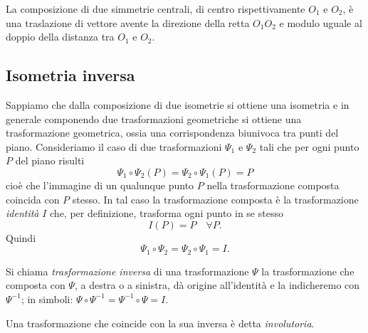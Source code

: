 \begin{proposizione}
La composizione di due simmetrie centrali, di centro rispettivamente 
$O_1$ e $O_2$, è una traslazione di vettore avente la direzione della 
retta $O_1O_2$ e modulo uguale al doppio della distanza tra $O_1$ e 
$O_2$.
\end{proposizione}
			
			
\subsection{Isometria inversa}
			
Sappiamo che dalla composizione di due isometrie si ottiene una 
isometria e in generale componendo due trasformazioni geometriche si 
ottiene una trasformazione geometrica, ossia una corrispondenza 
biunivoca tra punti del piano.
Consideriamo il caso di due trasformazioni $\Psi_1$ e $\Psi_2$ tali 
che per ogni punto $P$ del piano risulti
\[\Psi_1 \circ \Psi_2 (P) = \Psi_2 \circ \Psi_1 (P) = P\]
cioè che l'immagine di un qualunque punto $P$ nella trasformazione 
composta coincida con $P$ stesso. In tal caso la trasformazione 
composta è la trasformazione \emph{identità} $I$ che, per 
definizione, trasforma ogni punto in se stesso
\[I(P) = P\quad \forall P.\]
Quindi
\[\Psi_1 \circ \Psi_2 = \Psi_2 \circ \Psi_1 = I.\]

\begin{definizione}
Si chiama \emph{trasformazione inversa} di una trasformazione $\Psi$ 
la trasformazione che composta con $\Psi$, a destra o a sinistra, dà 
origine all'identità e la indicheremo con $\Psi^{-1}$; in simboli: 
$\Psi \circ \Psi^{-1} = \Psi^{-1} \circ \Psi = I$.
\end{definizione}
			
\begin{definizione}
Una trasformazione che coincide con la sua inversa è detta 
\emph{involutoria}.
\end{definizione}

% 
% 
% 
% 
